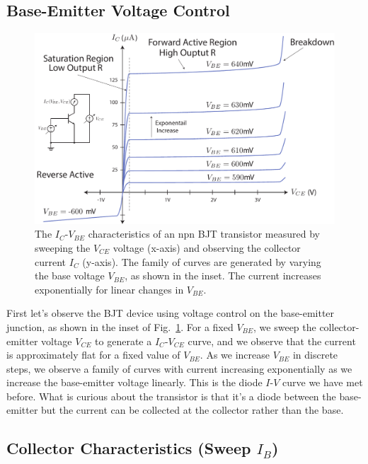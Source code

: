 \subsection{Base-Emitter Voltage Control}

\begin{figure}[tb]
\begin{center}
\includegraphics[width=\columnwidth]{slide8_bjt_ic_vs_ve_curves}
\end{center}
\caption{The $I_C$-$V_{BE}$ characteristics of an npn BJT transistor measured by sweeping the $V_{CE}$ voltage (x-axis) and observing the collector current $I_C$ (y-axis).  The family of curves are generated by varying the base voltage $V_{BE}$, as shown in the inset.  The current increases exponentially for linear changes in $V_{BE}$.} \label{fig:slide8_bjt_ic_vs_ve_curves}
\end{figure}

First let's observe the BJT device using voltage control on the base-emitter junction, as shown in the inset of Fig.~\ref{fig:slide8_bjt_ic_vs_ve_curves}.  For a fixed $V_{BE}$, we sweep the collector-emitter voltage $V_{CE}$ to generate a $I_C$-$V_{CE}$ curve, and we observe that the current is approximately flat for a fixed value of $V_{BE}$.  As we increase $V_{BE}$ in discrete steps, we observe a family of curves with current increasing exponentially as we increase the base-emitter voltage linearly.  This is the diode $I$-$V$ curve we have met before.  What is curious about the transistor is that it's a diode between the base-emitter but the current can be collected at the collector rather than the base.


\subsection{Collector Characteristics (Sweep $I_B$)}

